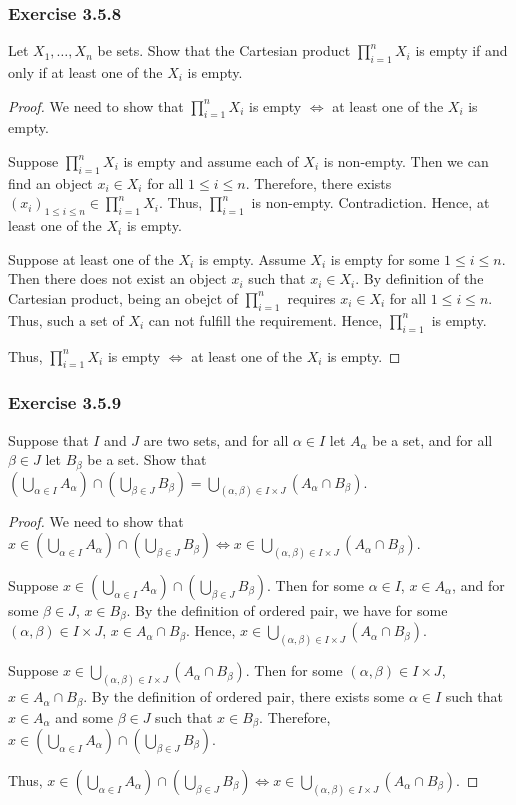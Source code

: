 \documentclass[12pt, letter]{article}
\begin{document}
\subsubsection*{Exercise 3.5.8}
Let $X_1,\dotsc,X_n$ be sets. Show that the Cartesian product $\prod_{i=1}^n X_i$ is empty if and only if at least one of the $X_i$ is empty.
\begin{proof}
    We need to show that $\prod_{i=1}^n X_i$ is empty $\iff$ at least one of the $X_i$ is empty.

    Suppose $\prod_{i=1}^n X_i$ is empty and assume each of $X_i$ is non-empty. Then we can find an object $x_i\in X_i$ for all $1\leq i\leq n$. Therefore, there exists $(x_i)_{1\leq i\leq n}\in \prod_{i=1}^n X_i$. Thus,
    $\prod_{i=1}^n$ is non-empty. Contradiction. Hence, at least one of the $X_i$ is empty.

    Suppose at least one of the $X_i$ is empty. Assume $X_i$ is empty for some $1\leq i\leq n$. Then there does not exist an object $x_i$ such that $x_i\in X_i$. By definition of the Cartesian product,
    being an obejct of $\prod_{i=1}^n$ requires $x_i\in X_i$ for all $1\leq i\leq n$. Thus, such a set of $X_i$ can not fulfill the requirement. Hence, $\prod_{i=1}^n$ is empty.
    
    Thus, $\prod_{i=1}^n X_i$ is empty $\iff$ at least one of the $X_i$ is empty.
\end{proof} 
\subsubsection*{Exercise 3.5.9}
Suppose that $I$ and $J$ are two sets, and for all $\alpha\in I$ let $A_{\alpha}$ be a set, and for all $\beta\in J$ let $B_\beta$ be a set. Show that $(\bigcup_{\alpha\in I}A_{\alpha})\cap (\bigcup_{\beta\in J}B_\beta)=\bigcup_{(\alpha,\beta)\in I\times J}(A_{\alpha}\cap B_\beta)$.
\begin{proof}
    We need to show that $x\in (\bigcup_{\alpha\in I}A_{\alpha})\cap (\bigcup_{\beta\in J}B_\beta)\iff x\in \bigcup_{(\alpha,\beta)\in I\times J}(A_{\alpha}\cap B_\beta)$.

    Suppose $x\in (\bigcup_{\alpha\in I}A_{\alpha})\cap (\bigcup_{\beta\in J}B_\beta)$. Then for some $\alpha\in I$, $x\in A_\alpha$, and for some $\beta\in J$, $x\in B_\beta$. By the definition of ordered pair,
    we have for some $(\alpha, \beta)\in I\times J$, $x\in A_\alpha\cap B_\beta$. Hence, $x\in \bigcup_{(\alpha,\beta)\in I\times J}(A_{\alpha}\cap B_\beta)$.

    Suppose $x\in\bigcup_{(\alpha,\beta)\in I\times J}(A_{\alpha}\cap B_\beta)$. Then for some $(\alpha,\beta)\in I\times J$, $x\in A_\alpha\cap B_\beta$. By the definition of ordered pair, there exists some $\alpha\in I$ such that $x\in A_\alpha$ and 
    some $\beta\in J$ such that $x\in B_\beta$. Therefore, $x\in (\bigcup_{\alpha\in I}A_{\alpha})\cap (\bigcup_{\beta\in J}B_\beta)$.

    Thus, $x\in (\bigcup_{\alpha\in I}A_{\alpha})\cap (\bigcup_{\beta\in J}B_\beta)\iff x\in \bigcup_{(\alpha,\beta)\in I\times J}(A_{\alpha}\cap B_\beta)$.
\end{proof}
\end{document}
